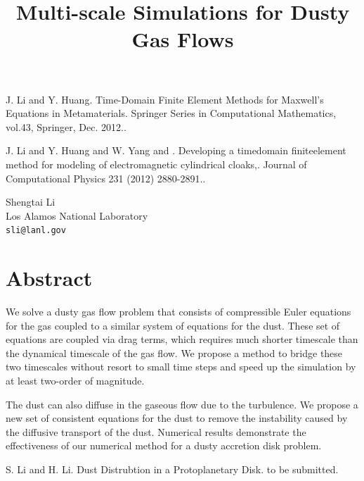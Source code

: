 \documentclass[article,A4,11pt]{llncs}%
\begin{document}

\begin{thebibliography}{10}
{\sc J. Li and Y. Huang}. {Time-Domain Finite Element Methods for Maxwell's Equations in Metamaterials}.  Springer Series in Computational Mathematics, vol.43, Springer, Dec. 2012..

{\sc J. Li and Y. Huang and W. Yang and  }. {Developing a timedomain finiteelement method for modeling of electromagnetic cylindrical cloaks,}. Journal of Computational Physics 231 (2012) 2880-2891..
\end{thebibliography}

\title{Multi-scale Simulations for Dusty Gas Flows}
 \author{} \institute{}
\maketitle
\begin{center}
{\large Shengtai Li}\\
Los Alamos National Laboratory\\
{\tt sli@lanl.gov}
\end{center}

\section*{Abstract}
We solve a dusty gas flow problem that consists of compressible Euler equations for the gas coupled to a similar system of equations for the dust. These set of equations are coupled via drag terms, which requires much shorter timescale than the dynamical timescale of the gas flow. We propose a method to bridge these two timescales without resort to small time steps and speed up the simulation by at least two-order of magnitude. 

The dust can also diffuse in the gaseous flow due to the turbulence. We propose a new set of consistent equations for the dust to remove the instability caused by the diffusive transport of the dust. Numerical results demonstrate the effectiveness of our numerical method for a dusty accretion disk problem. 


\begin{thebibliography}{10}
{\sc S. Li and H. Li}. {Dust Distrubtion in a Protoplanetary Disk}. to be submitted.
\end{thebibliography}
\end{document}
